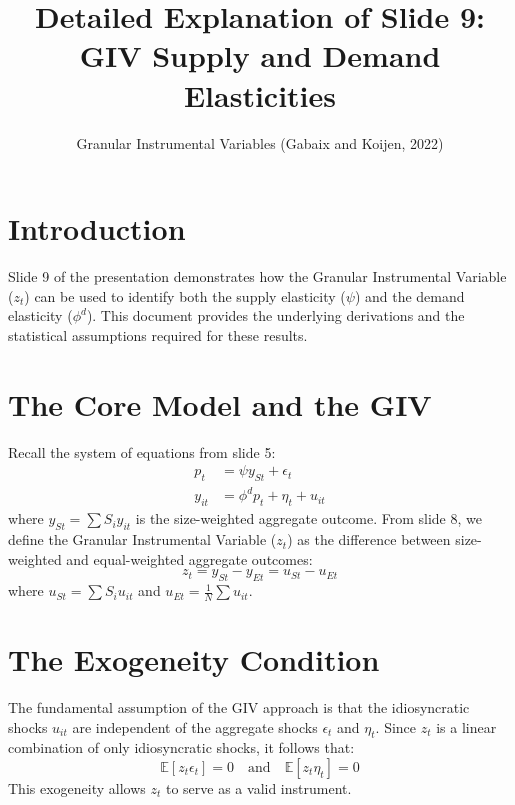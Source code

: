 \documentclass[11pt]{article}
\title{Detailed Explanation of Slide 9: GIV Supply and Demand Elasticities}
\author{Granular Instrumental Variables (Gabaix and Koijen, 2022)}
\date{}
\begin{document}
\maketitle

\section{Introduction}
Slide 9 of the presentation demonstrates how the Granular Instrumental Variable ($z_t$) can be used to identify both the supply elasticity ($\psi$) and the demand elasticity ($\phi^d$). This document provides the underlying derivations and the statistical assumptions required for these results.

\section{The Core Model and the GIV}
Recall the system of equations from slide 5:
\begin{align}
p_t &= \psi y_{St} + \epsilon_t \label{eq:supply} \tag{38} \\
y_{it} &= \phi^d p_t + \eta_t + u_{it} \label{eq:demand_firm} \tag{39}
\end{align}
where $y_{St} = \sum S_i y_{it}$ is the size-weighted aggregate outcome. From slide 8, we define the Granular Instrumental Variable ($z_t$) as the difference between size-weighted and equal-weighted aggregate outcomes:
\begin{equation}
z_t = y_{St} - y_{Et} = u_{St} - u_{Et} \label{eq:giv_def} \tag{42}
\end{equation}
where $u_{St} = \sum S_i u_{it}$ and $u_{Et} = \frac{1}{N} \sum u_{it}$. 

\section{The Exogeneity Condition}
The fundamental assumption of the GIV approach is that the idiosyncratic shocks $u_{it}$ are independent of the aggregate shocks $\epsilon_t$ and $\eta_t$. Since $z_t$ is a linear combination of only idiosyncratic shocks, it follows that:
\begin{equation}
\mathbb{E}[z_t \epsilon_t] = 0 \quad \text{and} \quad \mathbb{E}[z_t \eta_t] = 0 \label{eq:exogeneity}
\end{equation}
This exogeneity allows $z_t$ to serve as a valid instrument.
\end{document}
